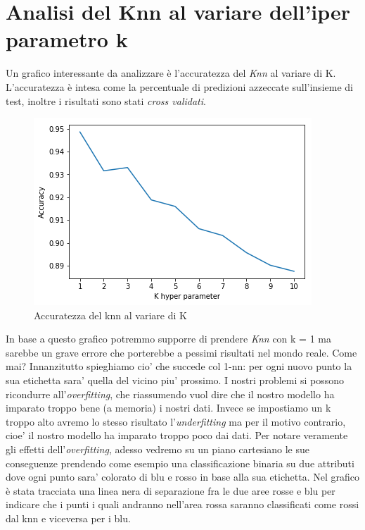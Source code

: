 \section{Analisi del Knn al variare dell'iper parametro k}
Un grafico interessante da analizzare \`e l'accuratezza del \textit{Knn} al variare di K. L'accuratezza \`e intesa come la percentuale di predizioni azzeccate sull'insieme di test, inoltre i risultati sono stati \textit{cross validati}.
\begin{figure}[H]
	\centering
	\includegraphics[width=0.7\linewidth]{img/accuracy_knn}
	\caption{Accuratezza del knn al variare di K}
	\label{fig:accuracyknn}
\end{figure}
In base a questo grafico potremmo supporre di prendere \textit{Knn} con k = 1 ma sarebbe un grave errore che porterebbe a pessimi risultati nel mondo reale. Come mai? Innanzitutto spieghiamo cio' che succede col 1-nn: per ogni nuovo punto la sua etichetta sara' quella del vicino piu' prossimo. I nostri problemi si possono ricondurre all'\textit{overfitting}, che riassumendo vuol dire che il nostro modello ha imparato troppo bene (a memoria) i nostri dati. Invece se impostiamo un k troppo alto avremo lo stesso risultato l'\textit{underfitting} ma per il motivo contrario, cioe' il nostro modello ha imparato troppo poco dai dati. Per notare veramente gli effetti dell'\textit{overfitting}, adesso vedremo su un piano cartesiano le sue conseguenze prendendo come esempio una classificazione binaria su due attributi dove ogni punto sara' colorato di blu e rosso in base alla sua etichetta. Nel grafico \`e stata tracciata una linea nera di separazione fra le due aree rosse e blu per indicare che i punti i quali andranno nell'area rossa saranno classificati come rossi dal knn e viceversa per i blu.

